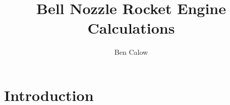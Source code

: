 \documentclass{article}
\title{Bell Nozzle Rocket Engine Calculations}
\author{Ben Calow}
\begin{document}
\maketitle

\section{Introduction}
\end{document}
